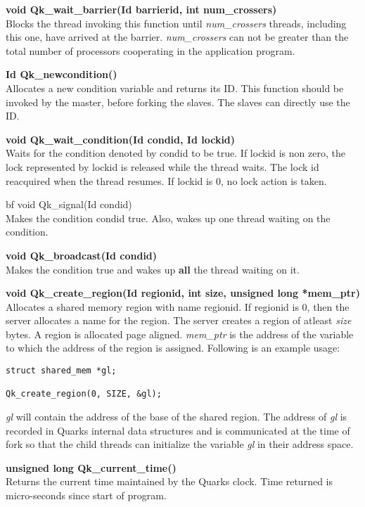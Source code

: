 {\bf void      Qk\_wait\_barrier(Id barrierid, int num\_crossers) }\\
 Blocks the thread invoking this function until 
 {\em num\_crossers} threads, including this one, have
 arrived at the barrier. {\em num\_crossers} can not be
 greater than the total number of processors 
 cooperating in the application program.

{\bf Id Qk\_newcondition() }\\
Allocates a new condition variable and returns its ID. This function
should be invoked by the master, before forking the slaves. The slaves
can directly use the ID.

{\bf void  Qk\_wait\_condition(Id condid, Id lockid)} \\
Waits for the condition denoted by condid to be true.
If lockid is non zero, the lock represented by lockid
is released while the thread waits. The lock id 
reacquired when the thread resumes. If lockid is 0, no
lock action is taken.

{bf void  Qk\_signal(Id condid)} \\
Makes the condition condid true. Also, wakes up one thread
waiting on the condition.

{\bf void Qk\_broadcast(Id condid)} \\
Makes the condition true and wakes up {\bf all} the thread 
waiting on it.

{\bf void Qk\_create\_region(Id regionid, int size, unsigned long *mem\_ptr)} \\
Allocates a shared memory region with name regionid. If regionid is
0, then the server allocates a name for the region. The server creates
a region of atleast {\em size} bytes. A region is allocated page
aligned. {\em mem\_ptr} is the address of the variable to which the
address of the region is assigned. Following is an example usage: \\

\begin{verbatim}
struct shared_mem *gl;

Qk_create_region(0, SIZE, &gl);
\end{verbatim}

{\em gl} will contain the address of the base of the shared region.
The address of {\em gl} is recorded in Quarks internal data structures
and is communicated at the time of fork so that the child threads can
initialize the variable {\em gl} in their address space. 

{\bf unsigned  long Qk\_current\_time() }\\
Returns the current time maintained by the Quarks clock.
Time returned is micro-seconds since start of program.

